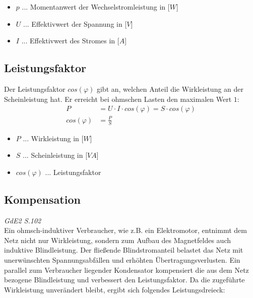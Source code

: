 \begin{itemize}
    \item $p$ ... Momentanwert der Wechselstromleistung in [$W$]
    \item $U$ ... Effektivwert der Spannung in [$V$]
    \item $I$ ... Effektivwert des Stromes in [$A$]
\end{itemize}

\subsection{Leistungsfaktor}
Der Leistungsfaktor $cos(\varphi)$ gibt an, welchen Anteil die Wirkleistung an der Scheinleistung hat. Er erreicht bei ohmschen Lasten den maximalen Wert $1$:
\begin{align}
    P &= U \cdot I \cdot cos(\varphi) = S \cdot cos(\varphi) \\
    cos(\varphi) &= \frac{P}{S} 
\end{align}
\begin{itemize}
    \item $P$ ... Wirkleistung in [$W$]
    \item $S$ ... Scheinleistung in [$VA$]
    \item $cos(\varphi)$ ... Leistungsfaktor
\end{itemize}

\subsection{Kompensation}
\textit{GdE2 S.102} \\
Ein ohmsch-induktiver Verbraucher, wie z.B. ein Elektromotor, entnimmt dem Netz nicht nur Wirkleistung, sondern zum Aufbau des Magnetfeldes auch induktive Blindleistung. Der fließende Blindstromanteil belastet das Netz mit unerwünschten Spannungsabfällen und erhöhten Übertragungsverlusten. Ein parallel zum Verbraucher liegender Kondensator kompensiert die aus dem Netz bezogene Blindleistung und verbessert den Leistungsfaktor. Da die zugeführte Wirkleistung unverändert bleibt, ergibt sich folgendes Leistungsdreieck:

